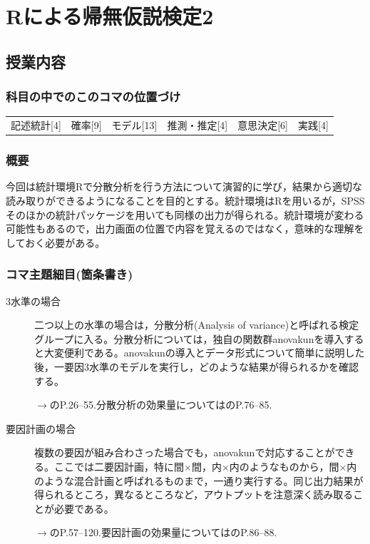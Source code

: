 \section{Rによる帰無仮説検定2}
\label{lesson22}

\subsection{授業内容}
\subsubsection{科目の中でのこのコマの位置づけ}
\begin{tabular}[t]{cccccc}
    記述統計[4] & 確率[9] & モデル[13] & 推測・推定[4] & 意思決定[6] & 実践[4]
\end{tabular}

\subsubsection{概要}
今回は統計環境Rで分散分析を行う方法について演習的に学び，結果から適切な読み取りができるようになることを目的とする。統計環境はRを用いるが，SPSSそのほかの統計パッケージを用いても同様の出力が得られる。統計環境が変わる可能性もあるので，出力画面の位置で内容を覚えるのではなく，意味的な理解をしておく必要がある。
\subsubsection{コマ主題細目(箇条書き)}
\begin{description}

\item[3水準の場合]二つ以上の水準の場合は，分散分析(Analysis of variance)と呼ばれる検定グループに入る。分散分析については，独自の関数群anovakunを導入すると大変便利である。anovakunの導入とデータ形式について簡単に説明した後，一要因3水準のモデルを実行し，どのような結果が得られるかを確認する。

\begin{flushright}
    $\to$\citet{橋本201607}のP.26--55.分散分析の効果量については\citet{大久保201201}のP.76--85.
\end{flushright}

\item[要因計画の場合]複数の要因が組み合わさった場合でも，anovakunで対応することができる。ここでは二要因計画，特に間$\times$間，内$\times$内のようなものから，間$\times$内のような混合計画と呼ばれるものまで，一通り実行する。同じ出力結果が得られるところ，異なるところなど，アウトプットを注意深く読み取ることが必要である。

\begin{flushright}
    $\to$\citet{橋本201607}のP.57--120.要因計画の効果量については\citet{大久保201201}のP.86--88.
\end{flushright}

\end{description}
